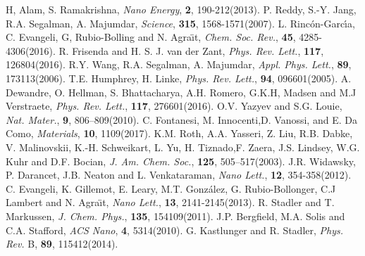 \documentclass[prb,showpacs,10pt,superscriptaddress]{revtex4-1}
\begin{document}
\begin{thebibliography}{}
H, Alam, S. Ramakrishna, \textit{Nano Energy}, \textbf{2}, 190-212(2013).
P. Reddy, S.-Y. Jang, R.A. Segalman, A. Majumdar, \textit{Science}, \textbf{315}, 1568-1571(2007).
L. Rinc\'{o}n-Garc\'{\i}a, C. Evangeli, G, Rubio-Bolling and N. Agra\"{\i}t,  \textit{Chem. Soc. Rev.}, \textbf{45}, 4285-4306(2016).
R. Frisenda and H. S. J. van der Zant,  \textit{Phys. Rev. Lett.}, \textbf{117}, 126804(2016).
R.Y. Wang, R.A. Segalman, A. Majumdar,  \textit{Appl. Phys. Lett.}, \textbf{89}, 173113(2006).
T.E. Humphrey, H. Linke, \textit{Phys. Rev. Lett.}, \textbf{94}, 096601(2005).  
A. Dewandre, O. Hellman, S. Bhattacharya, A.H. Romero, G.K.H, Madsen and M.J Verstraete, \textit{Phys. Rev. Lett.}, \textbf{117}, 276601(2016).
O.V. Yazyev and S.G. Louie, \textit{Nat. Mater.}, \textbf{9}, 806–809(2010).
C. Fontanesi, M. Innocenti,D. Vanossi, and E. Da Como, \textit{Materials}, \textbf{10}, 1109(2017).
K.M. Roth, A.A. Yasseri, Z. Liu, R.B. Dabke,
V. Malinovskii, K.-H. Schweikart, L. Yu, H. Tiznado,F. Zaera, J.S. Lindsey, W.G. Kuhr and D.F. Bocian, \textit{J. Am. Chem. Soc.}, \textbf{125}, 505–517(2003).
J.R. Widawsky, P. Darancet, J.B. Neaton and L. Venkataraman, \textit{Nano Lett.}, \textbf{12}, 354-358(2012).
C. Evangeli, K. Gillemot, E. Leary, M.T. Gonz\'{a}lez, G. Rubio-Bollonger, C.J Lambert and N. Agra\"{\i}t, \textit{Nano Lett.}, \textbf{13}, 2141-2145(2013).
R. Stadler and T. Markussen, \textit{J. Chem. Phys.}, \textbf{135}, 154109(2011).
J.P. Bergfield, M.A. Solis and C.A. Stafford, \textit{ACS Nano}, \textbf{4}, 5314(2010).
G. Kastlunger and R. Stadler, \textit{Phys. Rev.} B, \textbf{89}, 115412(2014).

\end{thebibliography}
\end{document}
